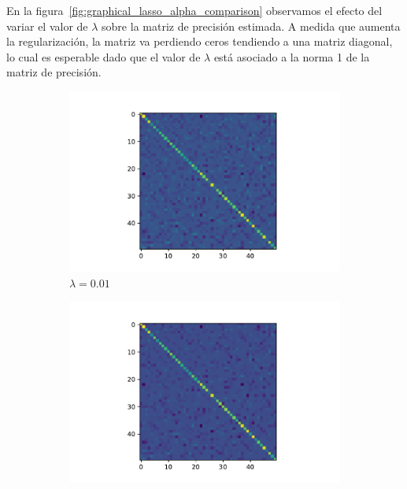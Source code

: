 \documentclass{article}
\begin{document}
En la figura~\ref{fig:graphical_lasso_alpha_comparison} observamos el efecto del variar el valor de $\lambda$ sobre la matriz de precisión estimada. A medida que aumenta la regularización, la matriz va perdiendo ceros tendiendo a una matriz diagonal, lo cual es esperable
dado que el valor de $\lambda$ está asociado a la norma 1 de la matriz de precisión.
\begin{figure}[htb]
    \centering
    \begin{subfigure}[t]{0.32\linewidth}
        \centering
        \includegraphics[width=\textwidth]{imagenes/graphical_lasso/graphical_lasso_alpha_0_01.pdf}
        \caption{$\lambda = 0.01$}
    \end{subfigure}\hfill
    \begin{subfigure}[t]{0.32\linewidth}
        \centering
        \includegraphics[width=\textwidth]{imagenes/graphical_lasso/graphical_lasso_alpha_0_02.pdf}

\end{subfigure}
\end{figure}
\end{document}
